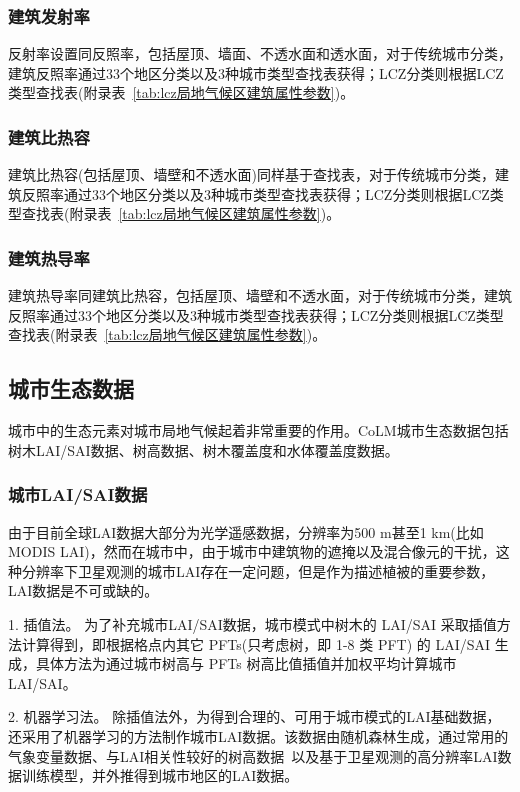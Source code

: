 \subsubsection{建筑发射率}\label{建筑发射率}
反射率设置同反照率，包括屋顶、墙面、不透水面和透水面，对于传统城市分类，建筑反照率通过33个地区分类以及3种城市类型查找表获得；LCZ分类则根据LCZ类型查找表(附录表~\ref{tab:lcz局地气候区建筑属性参数})。

\subsubsection{建筑比热容}\label{建筑比热容}
建筑比热容(包括屋顶、墙壁和不透水面)同样基于查找表，对于传统城市分类，建筑反照率通过33个地区分类以及3种城市类型查找表获得；LCZ分类则根据LCZ类型查找表(附录表~\ref{tab:lcz局地气候区建筑属性参数})。

\subsubsection{建筑热导率}\label{建筑热导率}
建筑热导率同建筑比热容，包括屋顶、墙壁和不透水面，对于传统城市分类，建筑反照率通过33个地区分类以及3种城市类型查找表获得；LCZ分类则根据LCZ类型查找表(附录表~\ref{tab:lcz局地气候区建筑属性参数})。

\subsection{城市生态数据}\label{城市生态数据}
城市中的生态元素对城市局地气候起着非常重要的作用。CoLM城市生态数据包括树木LAI/SAI数据、树高数据、树木覆盖度和水体覆盖度数据。

\subsubsection{城市LAI/SAI数据}\label{城市LAISAI数据}
由于目前全球LAI数据大部分为光学遥感数据，分辨率为500 m甚至1 km(比如MODIS LAI)，然而在城市中，由于城市中建筑物的遮掩以及混合像元的干扰，这种分辨率下卫星观测的城市LAI存在一定问题，但是作为描述植被的重要参数，LAI数据是不可或缺的。

1. 插值法\label{插值法LAI}。
为了补充城市LAI/SAI数据，城市模式中树木的 LAI/SAI 采取插值方法计算得到，即根据格点内其它 PFTs(只考虑树，即 1-8 类 PFT) 的 LAI/SAI 生成，具体方法为通过城市树高与 PFTs 树高比值插值并加权平均计算城市 LAI/SAI。

2. 机器学习法\label{机器学习法LAI}。
除插值法外，为得到合理的、可用于城市模式的LAI基础数据，还采用了机器学习的方法制作城市LAI数据。该数据由随机森林生成，通过常用的气象变量数据\citep{fick2017worldclim}、与LAI相关性较好的树高数据~\citep{lang2023high}以及基于卫星观测的高分辨率LAI数据\citep{lin2023ReprocessedMODISVersion}训练模型，并外推得到城市地区的LAI数据。
%
